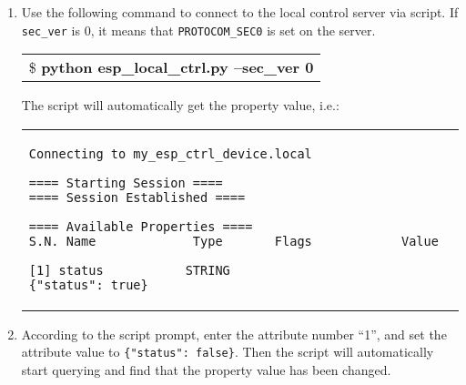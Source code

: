 \documentclass[a4paper,12pt]{book}
\begin{document}
\begin{enumerate}[label=\arabic*.,leftmargin=1.5em]
\begin{enumerate}[leftmargin=0em,label=\alph*.]
        \begin{codebloc}
        \begin{tabular}{a}
        \vspace{2pt}
        \fontsize{9pt}{10pt}\selectfont
\begin{verbatim}
1.  def get_transport(sel_transport, service_name, check_hostname):
2.  ...
3.      example_path = os.environ['IDF_PATH'] + '/examples/protocols/esp_local_ctrl'
4.      cert_path = example_path + '/main/certs/rootCA.pem'
\end{verbatim}
\verb|5.  ...|
        \end{tabular}
        \end{codebloc}
    \end{enumerate}

    \item Use the following command to connect to the local control server via script. If \verb|sec_ver| is 0, it means that \verb|PROTOCOM_SEC0| is set on the server.

    \begin{codebloc}
    \begin{tabular}{a}
\$ \textbf{python esp\_local\_ctrl.py --sec\_ver 0}
    \end{tabular}
    \end{codebloc}

    The script will automatically get the property value, i.e.:

    \begin{codebloc}
    \begin{tabular}{a}
    \vspace{2pt}
\begin{verbatim}
Connecting to my_esp_ctrl_device.local

==== Starting Session ====
==== Session Established ====

==== Available Properties ====
S.N. Name             Type       Flags            Value           
\end{verbatim}
\verb|[1] status           STRING                      {"status": true}|
    \end{tabular}
    \end{codebloc}

    \item According to the script prompt, enter the attribute number “1”, and set the attribute value to \verb|{"status": false}|. Then the script will automatically start querying and find that the property value has been changed.


\end{enumerate}
\end{document}
